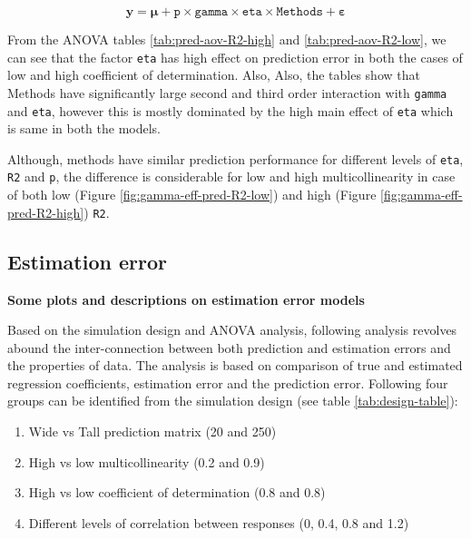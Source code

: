 \documentclass[12pt,3p,authoryear]{elsarticle}
\providecommand{\tightlist}{%
  \setlength{\itemsep}{0pt}\setlength{\parskip}{0pt}}
\begin{document}
\begin{equation}
\mathbf{y} = \boldsymbol{\mu} + \texttt{p} \times \texttt{gamma} \times \texttt{eta} \times \texttt{Methods} + \boldsymbol{\varepsilon}
\label{eq:separate-pred-model}
\end{equation}

From the ANOVA tables \ref{tab:pred-aov-R2-high} and
\ref{tab:pred-aov-R2-low}, we can see that the factor \texttt{eta} has
high effect on prediction error in both the cases of low and high
coefficient of determination. Also, Also, the tables show that Methods
have significantly large second and third order interaction with
\texttt{gamma} and \texttt{eta}, however this is mostly dominated by the
high main effect of \texttt{eta} which is same in both the models.









Although, methods have similar prediction performance for different
levels of \texttt{eta}, \texttt{R2} and \texttt{p}, the difference is
considerable for low and high multicollinearity in case of both low
(Figure \ref{fig:gamma-eff-pred-R2-low}) and high (Figure
\ref{fig:gamma-eff-pred-R2-high}) \texttt{R2}.

\subsection{Estimation error}\label{estimation-error}

\textbf{Some plots and descriptions on estimation error models}

Based on the simulation design and ANOVA analysis, following analysis
revolves abound the inter-connection between both prediction and
estimation errors and the properties of data. The analysis is based on
comparison of true and estimated regression coefficients, estimation
error and the prediction error. Following four groups can be identified
from the simulation design (see table \ref{tab:design-table}):

\begin{enumerate}
\def\labelenumi{\alph{enumi})}
\tightlist
\item
  Wide vs Tall prediction matrix (20 and 250)
\item
  High vs low multicollinearity (0.2 and 0.9)
\item
  High vs low coefficient of determination (0.8 and 0.8)
\item
  Different levels of correlation between responses (0, 0.4, 0.8 and
  1.2)
\end{enumerate}
\end{document}
